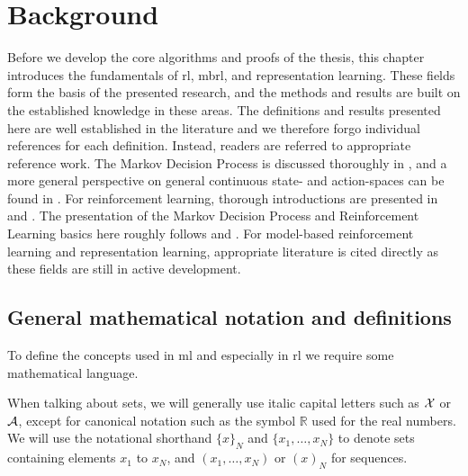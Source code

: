 \chapter{Background}
\label{chap:background}


Before we develop the core algorithms and proofs of the thesis, this chapter introduces the fundamentals of \ac{rl}, \ac{mbrl}, and representation learning.
These fields form the basis of the presented research, and the methods and results are built on the established knowledge in these areas.
The definitions and results presented here are well established in the literature and we therefore forgo individual references for each definition.
Instead, readers are referred to appropriate reference work.
The Markov Decision Process is discussed thoroughly in \textcite{puterman1994markov}, and a more general perspective on general continuous state- and action-spaces can be found in \textcite{bertsekasshreve1978}.
For reinforcement learning, thorough introductions are presented in \textcite{suttonbook} and \textcite{farahmand2021}.
The presentation of the Markov Decision Process and Reinforcement Learning basics here roughly follows \textcite{farahmand2011thesis} and \textcite{farahmand2021}.
For model-based reinforcement learning and representation learning, appropriate literature is cited directly as these fields are still in active development.



\section{General mathematical notation and definitions}
To define the concepts used in \ac{ml} and especially in \ac{rl} we require some mathematical language.

When talking about sets, we will generally use italic capital letters such as $\mathcal{X}$ or $\mathcal{A}$, except for canonical notation such as the symbol $\mathbb{R}$ used for the real numbers.
We will use the notational shorthand $\{x\}_N$ and $\{x_1, \dots, x_N\}$ to denote sets containing elements $x_1$ to $x_N$, and $(x_1, \dots, x_N)$ or $(x)_N$ for sequences.

